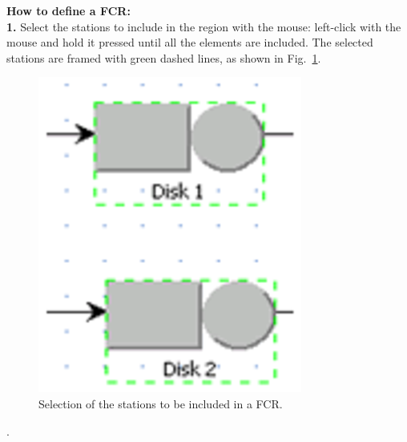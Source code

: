 \textbf{How to define a FCR:}\\
\textbf{ 1.}  Select the stations to include in the region with
the mouse: left-click with the mouse and hold it pressed until all
the elements are included. The selected stations are framed with
green dashed lines, as shown in Fig.~\ref{fig:selsatfcr}.\\
\begin{figure}[h]
    \begin{center}
        \includegraphics[scale=.5]{img/jsimg/8.1.eps}
    \end{center}
    \caption{Selection of the stations to be included in a FCR.}
    \label{fig:selsatfcr}
\end{figure}
.\\
